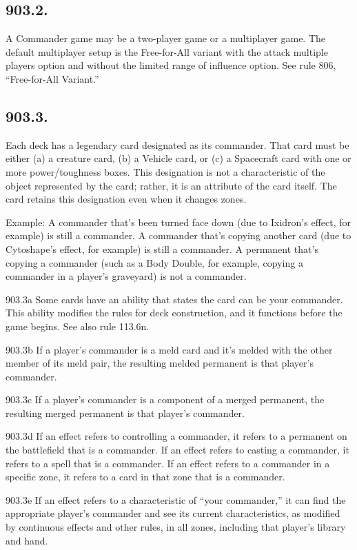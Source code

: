 \subsection*{903.2.}
A Commander game may be a two-player game or a multiplayer game. The default multiplayer setup is the Free-for-All variant with the attack multiple players option and without the limited range of influence option. See rule 806, “Free-for-All Variant.”

\subsection*{903.3.}
Each deck has a legendary card designated as its commander. That card must be either (a) a creature card, (b) a Vehicle card, or (c) a Spacecraft card with one or more power/toughness boxes. This designation is not a characteristic of the object represented by the card; rather, it is an attribute of the card itself. The card retains this designation even when it changes zones.

Example: A commander that’s been turned face down (due to Ixidron’s effect, for example) is still a commander. A commander that’s copying another card (due to Cytoshape’s effect, for example) is still a commander. A permanent that’s copying a commander (such as a Body Double, for example, copying a commander in a player’s graveyard) is not a commander.

903.3a Some cards have an ability that states the card can be your commander. This ability modifies the rules for deck construction, and it functions before the game begins. See also rule 113.6n.

903.3b If a player’s commander is a meld card and it’s melded with the other member of its meld pair, the resulting melded permanent is that player’s commander.

903.3c If a player’s commander is a component of a merged permanent, the resulting merged permanent is that player’s commander.

903.3d If an effect refers to controlling a commander, it refers to a permanent on the battlefield that is a commander. If an effect refers to casting a commander, it refers to a spell that is a commander. If an effect refers to a commander in a specific zone, it refers to a card in that zone that is a commander.

903.3e If an effect refers to a characteristic of “your commander,” it can find the appropriate player’s commander and see its current characteristics, as modified by continuous effects and other rules, in all zones, including that player’s library and hand.

